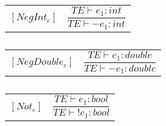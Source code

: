 \begin{table}[H]
    \begin{center}
    \begin{longtable}[c] { r c }
        $[NegInt_{e}]$ 
        & 
        \( \dfrac{T E  \vdash  e_1  :  int}{T E  \vdash  -e_1  :  int} \) 
    \end{longtable}
    \caption{}\label{s-empty}
        \end{center}
\end{table}

\begin{table}[H]
    \begin{center}
    \begin{longtable}[c] { r c }
        $[NegDouble_{e}]$ 
        & 
        \( \dfrac{T E  \vdash  e_1  :  double}{T E  \vdash  -e_1  :  double} \) 
    \end{longtable}
    \caption{}\label{s-empty}
        \end{center}
\end{table}

\begin{table}[H]
    \begin{center}
    \begin{longtable}[c] { r c }
        $[Not_{e}]$ 
        & 
        \( \dfrac{T E  \vdash  e_1  :  bool}{T E  \vdash  !e_1  :  bool} \) 
    \end{longtable}
    \caption{}\label{s-empty}
        \end{center}
\end{table}

